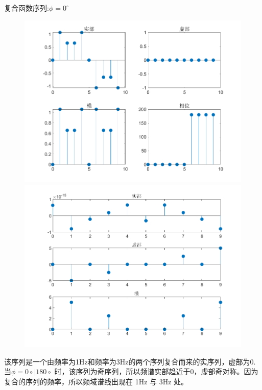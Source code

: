 \documentclass{beamer}
\begin{document}
\begin{frame}[t]{复合函数序列:$\phi = 0^\circ$}
    \begin{figure}
        \centering
        \begin{minipage}[t]{0.48\textwidth}
        \centering
        \includegraphics[width=\textwidth]{figure/复合函数序列_phi=0.png}
        \end{minipage}
        \begin{minipage}[t]{0.48\textwidth}
        \centering
        \includegraphics[width=\textwidth]{figure/频谱_复合函数序列_phi=0.png}
        \end{minipage}
    \end{figure}

    \begin{block}{}
        该序列是一个由频率为1Hz和频率为3Hz的两个序列复合而来的实序列，虚部为0. 当$\phi =0\circ | 180\circ$
时，该序列为奇序列，所以频谱实部趋近于0，虚部奇对称。因为复合的序列的频率，所以频域谱线出现在 1Hz 与 3Hz 处。
    \end{block}

\end{frame}
\end{document}
